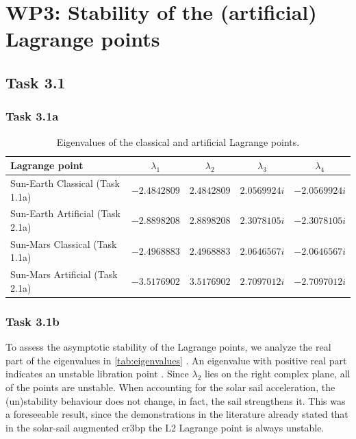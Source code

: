 \chapter{WP3: Stability of the (artificial) Lagrange points}
\label{chapter:wp3}

\section{Task 3.1}

\subsection{Task 3.1a}

\begin{table}[H]
  \centering
  \caption{Eigenvalues of the classical and artificial Lagrange points.}
  \label{tab:eigenvalues}
  \begin{tabular}{@{} l c c c c @{}}
    \toprule
    \textbf{Lagrange point} & $\lambda_1$ & $\lambda_2$ & $\lambda_3$ & $\lambda_4$ \\
    \midrule
    Sun-Earth Classical (Task 1.1a)  & $-2.4842809$ & $2.4842809$  & $2.0569924i$ & $-2.0569924i$ \\
    Sun-Earth Artificial (Task 2.1a) & $-2.8898208$ & $2.8898208$  & $2.3078105i$ & $-2.3078105i$ \\
    Sun-Mars Classical (Task 1.1a)   & $-2.4968883$ & $2.4968883$  & $2.0646567i$ & $-2.0646567i$ \\
    Sun-Mars Artificial (Task 2.1a)  & $-3.5176902$ & $3.5176902$  & $2.7097012i$ & $-2.7097012i$ \\
    \bottomrule
  \end{tabular}
\end{table}

\subsection{Task 3.1b}

To assess the asymptotic stability of the Lagrange points, we analyze the real part of the eigenvalues in \autoref{tab:eigenvalues} \parencite[sec 8.3]{battin1987introduction}.
An eigenvalue with positive real part indicates an unstable libration point \parencite{mcinnes1999artificial}. 
Since $\lambda_2$ lies on the right complex plane, all of the points are unstable. 
When accounting for the solar sail acceleration, the (un)stability behaviour does not change, in fact, the sail strengthens it. 
This was a foreseeable result, since the demonstrations in the literature \parencite{simmons1985restricted, bombardelli2011stability, aliasi2011artificial} already stated that in the solar-sail augmented \ac{cr3bp} the L2 Lagrange point is always unstable. 

